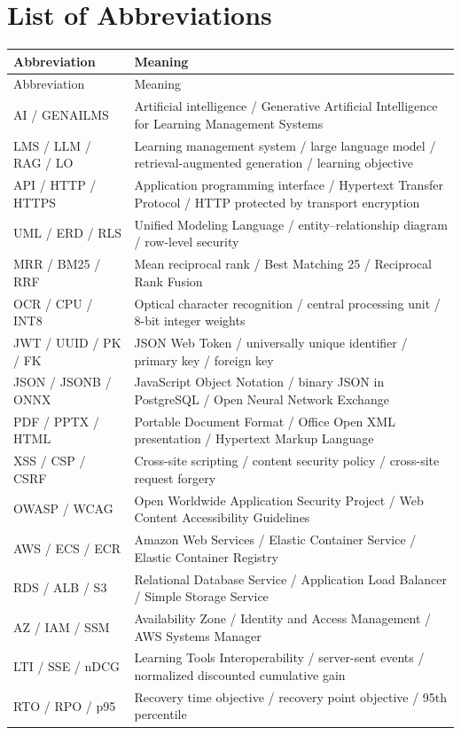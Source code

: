 \section*{List of Abbreviations}
\begingroup\small
\begin{longtable}{|p{3.0cm}|p{11.7cm}|}\hline
Abbreviation & Meaning\\\hline\endfirsthead
\hline Abbreviation & Meaning\\\hline\endhead
AI / GENAILMS & Artificial intelligence / Generative Artificial Intelligence for Learning Management Systems\\\hline
LMS / LLM / RAG / LO & Learning management system / large language model / retrieval-augmented generation / learning objective\\\hline
API / HTTP / HTTPS & Application programming interface / Hypertext Transfer Protocol / HTTP protected by transport encryption\\\hline
UML / ERD / RLS & Unified Modeling Language / entity--relationship diagram / row-level security\\\hline
MRR / BM25 / RRF & Mean reciprocal rank / Best Matching 25 / Reciprocal Rank Fusion\\\hline
OCR / CPU / INT8 & Optical character recognition / central processing unit / 8-bit integer weights\\\hline
JWT / UUID / PK / FK & JSON Web Token / universally unique identifier / primary key / foreign key\\\hline
JSON / JSONB / ONNX & JavaScript Object Notation / binary JSON in PostgreSQL / Open Neural Network Exchange\\\hline
PDF / PPTX / HTML & Portable Document Format / Office Open XML presentation / Hypertext Markup Language\\\hline
XSS / CSP / CSRF & Cross-site scripting / content security policy / cross-site request forgery\\\hline
OWASP / WCAG & Open Worldwide Application Security Project / Web Content Accessibility Guidelines\\\hline
AWS / ECS / ECR & Amazon Web Services / Elastic Container Service / Elastic Container Registry\\\hline
RDS / ALB / S3 & Relational Database Service / Application Load Balancer / Simple Storage Service\\\hline
AZ / IAM / SSM & Availability Zone / Identity and Access Management / AWS Systems Manager\\\hline
LTI / SSE / nDCG & Learning Tools Interoperability / server-sent events / normalized discounted cumulative gain\\\hline
RTO / RPO / p95 & Recovery time objective / recovery point objective / 95th percentile\\\hline
\end{longtable}\endgroup
